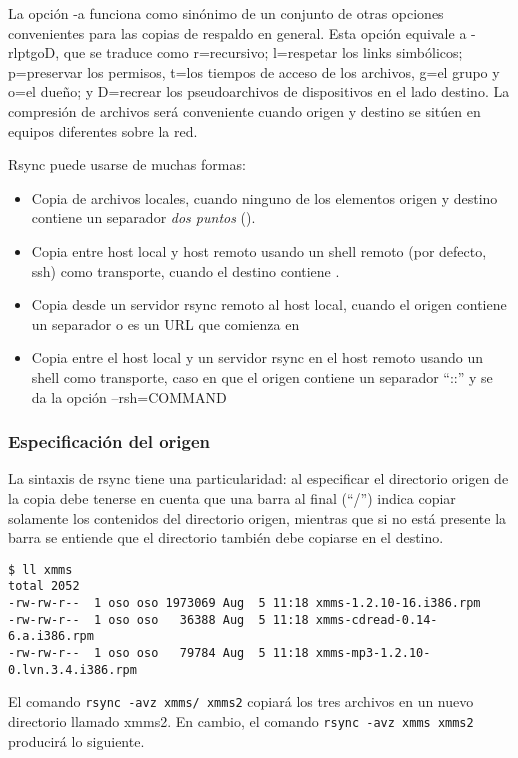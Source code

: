 La opción -a funciona como sinónimo de un conjunto de otras opciones convenientes para las copias de respaldo en general. Esta opción equivale a -rlptgoD, que se traduce como r=recursivo; l=respetar los links simbólicos; p=preservar los permisos, t=los tiempos de acceso de los archivos, g=el grupo y o=el dueño; y D=recrear los pseudoarchivos de dispositivos en el lado destino. La compresión de archivos será conveniente cuando origen y destino se sitúen en equipos diferentes sobre la red.


Rsync puede usarse de muchas formas:
\begin{itemize}
	\item Copia de archivos locales, cuando ninguno de los elementos origen y destino contiene un separador \emph{dos puntos} (\quotes{:}).
	\item Copia entre host local y host remoto usando un shell remoto (por defecto, ssh) como transporte, cuando el destino contiene \quotes{:}.
	\item Copia desde un servidor rsync remoto al host local, cuando el origen contiene un separador \quotes{::} o es un URL que comienza en 
	\item Copia entre el host local y un servidor rsync en el host remoto usando un shell como transporte, caso en que el origen contiene un separador “::” y se da la opción –rsh=COMMAND
\end{itemize}


\subsubsection{Especificación del origen}

La sintaxis de rsync tiene una particularidad: al especificar el directorio origen de la copia debe tenerse en cuenta que una barra al final (“/”) indica copiar solamente los contenidos del directorio origen, mientras que si no está presente la barra se entiende que el directorio también debe copiarse en el destino. 

\begin{lstlisting}
$ ll xmms
total 2052
-rw-rw-r--  1 oso oso 1973069 Aug  5 11:18 xmms-1.2.10-16.i386.rpm
-rw-rw-r--  1 oso oso   36388 Aug  5 11:18 xmms-cdread-0.14-6.a.i386.rpm
-rw-rw-r--  1 oso oso   79784 Aug  5 11:18 xmms-mp3-1.2.10-0.lvn.3.4.i386.rpm
\end{lstlisting}

El comando \lstinline$rsync -avz xmms/ xmms2$ copiará los tres archivos en un nuevo directorio llamado xmms2. En cambio, el comando \lstinline$rsync -avz xmms xmms2$ producirá lo siguiente.

